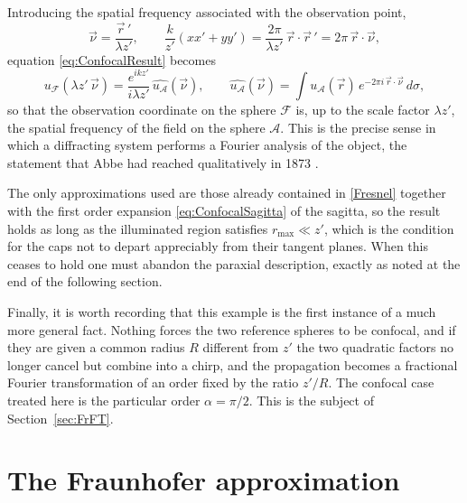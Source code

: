 		Introducing the spatial frequency associated with the observation point,
		\begin{equation}\label{eq:ConfocalFrequency}
			\vec{\nu} = \dfrac{\vec{r}\,'}{\lambda z'}, \qquad \dfrac{k}{z'}\left(xx'+yy'\right) = \dfrac{2\pi}{\lambda z'}\,\vec{r}\cdot\vec{r}\,' = 2\pi\,\vec{r}\cdot\vec{\nu},
		\end{equation}
		equation \eqref{eq:ConfocalResult} becomes
		\begin{equation}\label{eq:ConfocalFourier}
			u_{\mathcal{F}}(\lambda z'\,\vec{\nu}) = \dfrac{e^{ikz'}}{i\lambda z'}\,\widehat{u_{\mathcal{A}}}(\vec{\nu}), \qquad \widehat{u_{\mathcal{A}}}(\vec{\nu}) = \int u_{\mathcal{A}}(\vec{r})\,e^{-2\pi i\,\vec{r}\cdot\vec{\nu}}\,d\sigma ,
		\end{equation}
		so that the observation coordinate on the sphere $\mathcal{F}$ is, up to the scale factor $\lambda z'$, the spatial frequency of the field on the sphere $\mathcal{A}$. This is the precise sense in which a diffracting system performs a Fourier analysis of the object, the statement that Abbe had reached qualitatively in 1873 \citep{abbe1873beitrage}.

		The only approximations used are those already contained in \eqref{Fresnel} together with the first order expansion \eqref{eq:ConfocalSagitta} of the sagitta, so the result holds as long as the illuminated region satisfies $r_{\max}\ll z'$, which is the condition for the caps not to depart appreciably from their tangent planes. When this ceases to hold one must abandon the paraxial description, exactly as noted at the end of the following section.

		Finally, it is worth recording that this example is the first instance of a much more general fact. Nothing forces the two reference spheres to be confocal, and if they are given a common radius $R$ different from $z'$ the two quadratic factors no longer cancel but combine into a chirp, and the propagation becomes a fractional Fourier transformation of an order fixed by the ratio $z'/R$. The confocal case treated here is the particular order $\alpha = \pi/2$. This is the subject of Section~\ref{sec:FrFT}.

\section{The Fraunhofer approximation}

